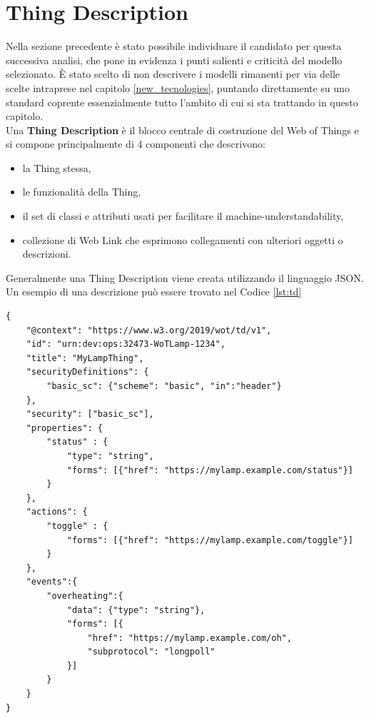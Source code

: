 \documentclass[12pt,a4paper,openright,oneside]{report}
\begin{document}
\section{Thing Description}
Nella sezione precedente è stato possibile individuare il candidato per questa successiva analisi, che pone in evidenza i punti salienti e criticità del modello selezionato. È stato scelto di non descrivere i modelli rimanenti per via delle scelte intraprese nel capitolo \ref{new_tecnologies}, puntando direttamente su uno standard coprente essenzialmente tutto l'ambito di cui si sta trattando in questo capitolo.\\

Una \textbf{Thing Description} è il blocco centrale di costruzione del Web of Things e si compone principalmente di 4 componenti che descrivono: 
\begin{itemize}
	\setlength\itemsep{-0.5em}
	\item la Thing stessa,
	\item le funzionalità della Thing,
	\item il set di classi e attributi usati per facilitare il machine-understandability,
	\item collezione di Web Link che esprimono collegamenti con ulteriori oggetti o descrizioni.
\end{itemize}

Generalmente una Thing Description viene creata utilizzando il linguaggio JSON. Un esempio di una descrizione può essere trovato nel Codice \ref{lst:td}

\begin{lstlisting}[caption={Esempio di una Thing Description},captionpos=b,label=lst:td]
{
	"@context": "https://www.w3.org/2019/wot/td/v1",
	"id": "urn:dev:ops:32473-WoTLamp-1234",
	"title": "MyLampThing",
	"securityDefinitions": {
		"basic_sc": {"scheme": "basic", "in":"header"}
	},
	"security": ["basic_sc"],
	"properties": {
		"status" : {
			"type": "string",
			"forms": [{"href": "https://mylamp.example.com/status"}]
		}
	},
	"actions": {
		"toggle" : {
			"forms": [{"href": "https://mylamp.example.com/toggle"}]
		}
	},
	"events":{
		"overheating":{
			"data": {"type": "string"},
			"forms": [{
				"href": "https://mylamp.example.com/oh",
				"subprotocol": "longpoll"
			}]
		}
	}
}
\end{lstlisting}
\end{document}
